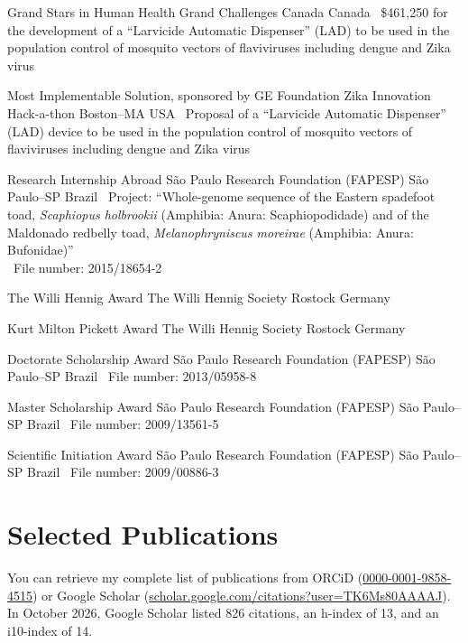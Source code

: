\documentclass[11pt, letterpaper, sans]{moderncv}
\begin{document}
	{Grand Stars in Human Health}
	{Grand Challenges Canada}
	{Canada}
	{}
	{\textbullet~\$461,250 for the development of a ``Larvicide Automatic Dispenser'' (LAD) to be used in the population control of mosquito vectors of flaviviruses including dengue and Zika virus}

	{Most Implementable Solution, sponsored by GE Foundation}
	{Zika Innovation Hack-a-thon}
	{Boston--MA}
	{USA}
	{\textbullet~Proposal of a ``Larvicide Automatic Dispenser'' (LAD) device to be used in the population control of mosquito vectors of flaviviruses including dengue and Zika virus}

	{Research Internship Abroad}
	{São Paulo Research Foundation (FAPESP)}
	{São Paulo--SP}
	{Brazil}
	{
		\textbullet~Project: ``Whole-genome sequence of the Eastern spadefoot toad, \textit{Scaphiopus holbrookii} (Amphibia: Anura: Scaphiopodidade) and of the Maldonado redbelly toad, \textit{Melanophryniscus moreirae} (Amphibia: Anura: Bufonidae)''\\
		\textbullet~File number: 2015/18654-2
	}

	{The Willi Hennig Award}
	{The Willi Hennig Society}
	{Rostock}
	{Germany}
	{}

\cventry{---}
	{Kurt Milton Pickett Award}
	{The Willi Hennig Society}
	{Rostock}
	{Germany}
	{}

	{Doctorate Scholarship Award}
	{São Paulo Research Foundation (FAPESP)}
	{São Paulo--SP}
	{Brazil}
	{
		\textbullet~File number: 2013/05958-8
	}

	{Master Scholarship Award}
	{São Paulo Research Foundation (FAPESP)}
	{São Paulo--SP}
	{Brazil}
	{
		\textbullet~File number: 2009/13561-5
	}

	{Scientific Initiation Award}
	{São Paulo Research Foundation (FAPESP)}
	{São Paulo--SP}
	{Brazil}
	{
		\textbullet~File number: 2009/00886-3
	}


\section{Selected Publications}

You can retrieve my complete list of publications from ORCiD (\href{https://orcid.org/0000-0001-9858-4515}{0000-0001-9858-4515}) or Google Scholar (\href{https://scholar.google.com/citations?user=TK6Ms80AAAAJ\&hl=en}{scholar.google.com/citations?user=TK6Ms80AAAAJ}). In October 2026, Google Scholar listed 826 citations, an h-index of 13, and an i10-index of 14.
\end{document}
